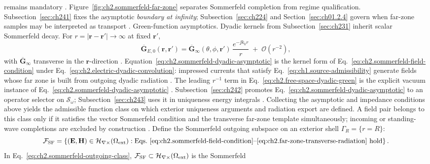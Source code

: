 remains mandatory \cite{stratton1941}. Figure~\ref{fig:ch2.sommerfeld-far-zone} separates Sommerfeld completion from regime qualification. Subsection~\ref{sec:ch241} fixes the asymptotic \emph{boundary at
infinity}; Subsection~\ref{sec:ch224} and Section~\ref{sec:ch01.2.4} govern when
far-zone samples may be interpreted as transport \cite{stratton1941}. Green-function asymptotics. Dyadic kernels from Subsection~\ref{sec:ch231} inherit scalar Sommerfeld decay.
For \(r=|\mathbf{r}-\mathbf{r}'|\to\infty\) at fixed \(\mathbf{r}'\),
\begin{equation}
\label{eq:ch2.sommerfeld-dyadic-asymptotic}
\overline{\mathbf{G}}_{E,0}(\mathbf{r},\mathbf{r}')
=
\overline{\mathbf{G}}_{\infty}(\theta,\phi,\mathbf{r}')\,
\frac{e^{-\jj k_0 r}}{r}
\;+\;\mathcal{O}(r^{-2}),
\end{equation}
with \(\overline{\mathbf{G}}_{\infty}\) transverse in the \(\mathbf{r}\)-direction
\cite{stratton1941}. Equation~\eqref{eq:ch2.sommerfeld-dyadic-asymptotic}
is the kernel form of Eq.~\eqref{eq:ch2.sommerfeld-field-condition} under
Eq.~\eqref{eq:ch2.electric-dyadic-convolution}: impressed currents that satisfy
Eq.~\eqref{eq:ch1.source-admissibility} generate fields whose far zone is built from
outgoing dyadic radiation \cite{stratton1941}. The leading \(r^{-1}\) term in
Eq.~\eqref{eq:ch2.free-space-dyadic-green} is the explicit vacuum instance of
Eq.~\eqref{eq:ch2.sommerfeld-dyadic-asymptotic} \cite{jackson1999}. Subsection~\ref{sec:ch242}
promotes Eq.~\eqref{eq:ch2.sommerfeld-dyadic-asymptotic} to an operator selector on
\(\mathcal{S}_\omega\); Subsection~\ref{sec:ch243} uses it in uniqueness energy
integrals \cite{harrington2001}.
Collecting the asymptotic and impedance conditions above yields the admissible function class
on which exterior uniqueness arguments and radiation export are defined. A field pair belongs
to this class only if it satisfies the vector Sommerfeld condition and the transverse far-zone
template simultaneously; incoming or standing-wave completions are excluded by construction
\cite{harrington2001}. Define the Sommerfeld outgoing subspace on an exterior shell
\(\Gamma_R=\{r=R\}\):
\begin{equation}
\label{eq:ch2.sommerfeld-outgoing-class}
\mathcal{F}_{\mathrm{SF}}
=
\left\{
(\mathbf{E},\mathbf{H})\in\mathcal{H}_{\nabla\times}(\Omega_{\mathrm{ext}}):
\text{Eqs.~\eqref{eq:ch2.sommerfeld-field-condition}--\eqref{eq:ch2.far-zone-transverse-radiation} hold}
\right\}.
\end{equation}
In Eq.~\eqref{eq:ch2.sommerfeld-outgoing-class},
\(\mathcal{F}_{\mathrm{SF}}\subset\mathcal{H}_{\nabla\times}(\Omega_{\mathrm{ext}})\) is the Sommerfeld
